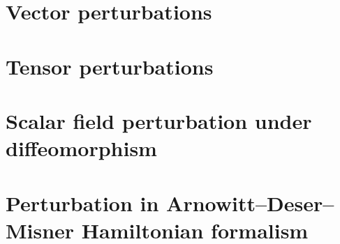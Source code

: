 \documentclass[a4paper,11pt]{article}
\begin{document}
\section{Vector perturbations}



\section{Tensor perturbations}



\section{Scalar field perturbation under diffeomorphism}


\section{Perturbation in Arnowitt--Deser--Misner Hamiltonian formalism}

\end{document}
